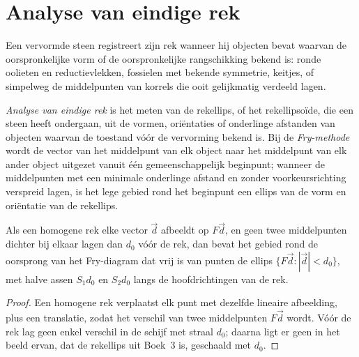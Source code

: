 \section{Analyse van eindige rek}\label{sec:b3:structural-analysis:strain}

Een vervormde steen registreert zijn rek wanneer hij objecten bevat waarvan de oorspronkelijke
vorm of de oorspronkelijke rangschikking bekend is: ronde oolieten en reductievlekken,
fossielen met bekende symmetrie, keitjes, of simpelweg de middelpunten van korrels
die ooit gelijkmatig verdeeld lagen.

\begin{definition}\label{def:b3:structural-analysis:strain-analysis}
\emph{Analyse van eindige rek} is het meten van
de rekellips, of het rekellipsoïde, die een steen heeft ondergaan, uit de
vormen, oriëntaties of onderlinge afstanden van objecten waarvan de toestand vóór de
vervorming bekend is. Bij de \emph{Fry-methode} wordt de vector
van het middelpunt van elk object naar het middelpunt van elk ander object uitgezet vanuit
één gemeenschappelijk beginpunt; wanneer de middelpunten met een minimale onderlinge afstand en zonder
voorkeursrichting verspreid lagen, is het lege gebied rond het beginpunt een ellips van de
vorm en oriëntatie van de rekellips.
\end{definition}

\begin{proposition}\label{prop:b3:structural-analysis:fry}
Als een homogene rek elke vector $\vec d$ afbeeldt op $F\vec d$, en geen twee
middelpunten dichter bij elkaar lagen dan $d_0$ vóór de rek, dan bevat het gebied
rond de oorsprong van het Fry-diagram dat vrij is van punten de ellips
$\{F\vec d : |\vec d| < d_0\}$, met halve assen $S_1d_0$ en $S_2d_0$ langs de
hoofdrichtingen van de rek.
\end{proposition}

\begin{proof}
Een homogene rek verplaatst elk punt met dezelfde lineaire afbeelding, plus een
translatie, zodat het verschil van twee middelpunten $F\vec d$ wordt. Vóór de rek lag
geen enkel verschil in de schijf met straal $d_0$; daarna ligt er geen in het beeld ervan,
dat de rekellips uit Boek~3 is, geschaald met $d_0$.
\end{proof}

